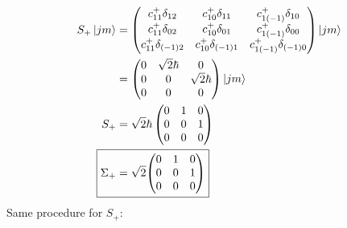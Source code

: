 \documentclass{jhwhw}
\begin{document}
\begin{align}
    S_{+}\ket{j m}
    &=
    \begin{pmatrix}
        c_{11}^+ \delta_{12}    &   c_{10}^+ \delta_{11}    &   c_{1(-1)}^+ \delta_{10}    \\
        c_{11}^+ \delta_{02}    &   c_{10}^+ \delta_{01}    &   c_{1(-1)}^+ \delta_{00}    \\
        c_{11}^+ \delta_{(-1)2}    &   c_{10}^+ \delta_{(-1)1}    &   c_{1(-1)}^+ \delta_{(-1)0}
    \end{pmatrix}
    \ket{j m}
    \\
    &=
    \begin{pmatrix}
        0   &   \sqrt{2}\hbar   &   0   \\
        0   &   0   &   \sqrt{2}\hbar   \\
        0   &   0   &   0   
    \end{pmatrix}
    \ket{j m}
    \\
    S_{+}
    &=
    \sqrt{2}\hbar
    \begin{pmatrix}
        0   &   1   &   0   \\
        0   &   0   &   1   \\
        0   &   0   &   0   
    \end{pmatrix}
    \\
    \Aboxed{
    \Sigma_+
    &=
    \sqrt{2}
    {\begin{pmatrix}
        0   &   1   &   0   \\
        0   &   0   &   1   \\
        0   &   0   &   0   
    \end{pmatrix}}
    }
\end{align}
Same procedure for $S_{+}$:
\end{document}
